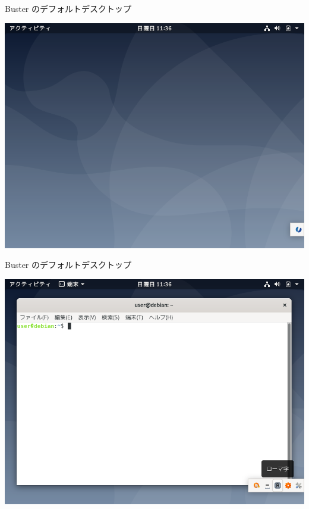 \begin{frame}{Buster のデフォルトデスクトップ}

\begin{center}
\includegraphics[keepaspectratio,width=1\hsize]{image201907/buster_gnome_1.png}
\end{center}

\end{frame}

\begin{frame}{Buster のデフォルトデスクトップ}

\begin{center}
\includegraphics[keepaspectratio,width=1\hsize]{image201907/buster_gnome_2.png}
\end{center}

\end{frame}

